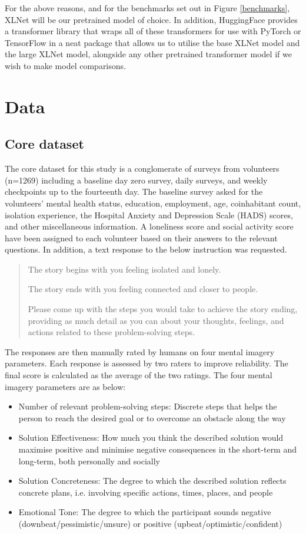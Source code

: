 \documentclass[12pt, a4paper]{article}
\begin{document}
For the above reasons, and for the benchmarks set out in Figure \ref{benchmarks}, XLNet will be our pretrained model of choice. In addition, HuggingFace \cite{Wolf2019HuggingFacesTS} provides a transformer library that wraps all of these transformers for use with PyTorch or TensorFlow in a neat package that allows us to utilise the base XLNet model and the large XLNet model, alongside any other pretrained transformer model if we wish to make model comparisons. 

\section{Data}

\subsection{Core dataset}
The core dataset for this study is a conglomerate of surveys from volunteers (n=1269) including a baseline day zero survey, daily surveys, and weekly checkpoints up to the fourteenth day. The baseline survey asked for the volunteers' mental health status, education, employment, age, coinhabitant count, isolation experience, the Hospital Anxiety and Depression Scale (HADS) scores, and other miscellaneous information. A loneliness score and social activity score have been assigned to each volunteer based on their answers to the relevant questions. In addition, a text response to the below instruction was requested. 

\begin{quote}
The story begins with you feeling isolated and lonely.

The story ends with you feeling connected and closer to people.

Please come up with the steps you would take to achieve the story ending, providing as much detail as you can about your thoughts, feelings, and actions related to these problem-solving steps.
\end{quote}

The responses are then manually rated by humans on four mental imagery parameters. Each response is assessed by two raters to improve reliability. The final score is calculated as the average of the two ratings. The four mental imagery parameters are as below:

\begin{itemize}
  \item Number of relevant problem-solving steps: Discrete steps that helps the person to reach the desired goal or to overcome an obstacle along the way
  \item Solution Effectiveness: How much you think the described solution would maximise positive and minimise negative consequences in the short-term and long-term, both personally and socially
  \item Solution Concreteness: The degree to which the described solution reflects concrete plans, i.e. involving specific actions, times, places, and people
  \item Emotional Tone: The degree to which the participant sounds negative (downbeat/pessimistic/unsure) or positive (upbeat/optimistic/confident)
\end{itemize}
\end{document}
